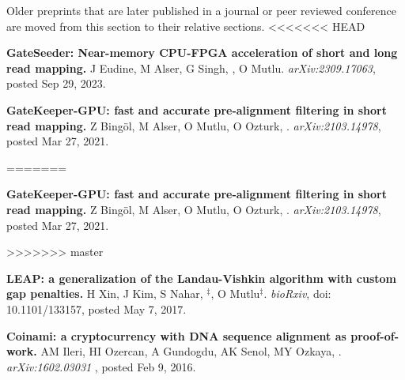 \small{
Older preprints that are later published in a journal or peer reviewed conference are moved from this section to their relative sections.
}
<<<<<<< HEAD

\vspace{-.2cm}
{\bf GateSeeder: Near-memory CPU-FPGA acceleration of short and long read mapping.}
J Eudine, M Alser, G Singh, \calkan{}, O Mutlu.
{\it arXiv:2309.17063}, posted Sep 29, 2023.




\vspace{-.2cm}
{\bf GateKeeper-GPU: fast and accurate pre-alignment filtering in short read mapping.}
Z Bingöl, M Alser, O Mutlu, O Ozturk, \calkan{}.
{\it arXiv:2103.14978}, posted Mar 27, 2021.


=======





\vspace{-.2cm}
{\bf GateKeeper-GPU: fast and accurate pre-alignment filtering in short read mapping.}
Z Bingöl, M Alser, O Mutlu, O Ozturk, \calkan{}.
{\it arXiv:2103.14978}, posted Mar 27, 2021.


>>>>>>> master


\vspace{-.2cm}
 {\bf LEAP: a generalization of the Landau-Vishkin algorithm with custom gap penalties.}
 H Xin, J Kim, S Nahar, \calkan{}$^\ddag$, O Mutlu$^\ddag$.
{\it bioRxiv}, doi: 10.1101/133157, posted May 7, 2017.

\vspace{-.2cm}
 {\bf  Coinami: a cryptocurrency with DNA sequence alignment as proof-of-work.}
 AM Ileri, HI Ozercan, A Gundogdu, AK Senol, MY Ozkaya, \calkan{}.
{\it arXiv:1602.03031} , posted Feb 9, 2016.


\vspace{-.4cm}

